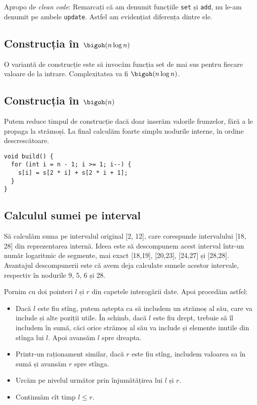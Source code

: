 Apropo de \textit{clean code}: Remarcați că am denumit funcțiile \texttt{set} și \texttt{add}, nu le-am denumit pe ambele \texttt{update}. Astfel am evidențiat diferența dintre ele.

\subsection{Construcția în $\bigoh(n \log n)$}

O variantă de construcție este să invocăm funcția set de mai sus pentru fiecare valoare de la intrare. Complexitatea va fi $\bigoh(n \log n)$.

\subsection{Construcția în $\bigoh(n)$}

Putem reduce timpul de construcție dacă doar inserăm valorile frunzelor, fără a le propaga la strămoși. La final calculăm foarte simplu nodurile interne, în ordine descrescătoare.

\begin{verbatim}
void build() {
  for (int i = n - 1; i >= 1; i--) {
    s[i] = s[2 * i] + s[2 * i + 1];
  }
}
\end{verbatim}

\subsection{Calculul sumei pe interval}

Să calculăm suma pe intervalul original [2, 12], care corespunde intervalului [18, 28] din reprezentarea internă. Ideea este să descompunem acest interval într-un număr logaritmic de segmente, mai exact [18,19], [20,23], [24,27] și [28,28]. Avantajul descompunerii este că avem deja calculate sumele acestor intervale, respectiv în nodurile 9, 5, 6 și 28.

Pornim cu doi pointeri $l$ și $r$ din capetele interogării date. Apoi procedăm astfel:

\begin{itemize}
  \item Dacă $l$ este fiu stîng, putem aștepta ca să includem un strămoș al său, care va include și alte poziții utile. În schimb, dacă $l$ este fiu drept, trebuie să îl includem în sumă, căci orice strămoș al său va include și elemente inutile din stînga lui $l$. Apoi avansăm $l$ spre dreapta.

  \item Printr-un raționament similar, dacă $r$ este fiu stîng, includem valoarea sa în sumă și avansăm $r$ spre stînga.

  \item Urcăm pe nivelul următor prin înjumătățirea lui $l$ și $r$.

  \item Continuăm cît timp $l \leq r$.
\end{itemize}

